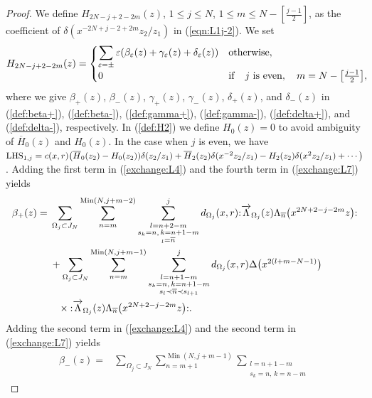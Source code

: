 \documentclass[pdftex]{sigma}
\numberwithin{equation}{section}
\begin{document}
\begin{proof}
{\sloppy We define ${H}_{2N-j+2-2m}(z)$, $1\leq j \leq N$, $1\leq m \leq N-[\frac{j-1}{2}]$,
as the coefficient of $\delta(x^{-2N+j-2+2m}z_2/z_1)$ in (\ref{eqn:L1j-2}). We set
\begin{gather}
{H}_{2N-j+2-2m}(z)=\begin{cases}
\displaystyle \sum_{\varepsilon=\pm}
\varepsilon ({\beta}_\varepsilon(z)+{\gamma}_\varepsilon(z)+{\delta}_\varepsilon(z))
& {\rm otherwise},
\\
0&{\rm {if}}\quad j~{\rm {is}~even},\quad m=N-\big[\frac{j-1}{2}\big],
\end{cases}\!\!\!\label{def:H2}
\end{gather}}%
where we give
${\beta}_+(z)$, ${\beta}_-(z)$, ${\gamma}_+(z)$,
${\gamma}_-(z)$, ${\delta}_+(z)$, and ${\delta}_-(z)$
in (\ref{def:beta+}), (\ref{def:beta-}), (\ref{def:gamma+}), (\ref{def:gamma-}),
(\ref{def:delta+}), and (\ref{def:delta-}), respectively.
In (\ref{def:H2}) we define $H_0(z)=0$ to avoid ambiguity of
$\overline{H}_0(z)$ and $H_0(z)$. In the case when $j$ is even, we have
${\rm LHS}_{1,j}=c(x,r)\big(\overline{H}_0(z_2)-H_0(z_2))\delta(z_2/z_1)
+\overline{H}_2(z_2)\delta(x^{-2}z_2/z_1)-H_2(z_2)\delta(x^2z_2/z_1)+\cdots\big)$.
Adding the first term in (\ref{exchange:L4}) and the fourth term
in (\ref{exchange:L7}) yields
\begin{align}
\beta_+(z)={}&\sum_{\Omega_j \subset J_N}
\sum_{n=m}^{\operatorname{Min}(N, j+m-2)}
\sum\limits_{\substack{l=n+2-m\\s_k=n,\, k=n+1-m
\\{_l=\overline{n}}}}^{j}d_{\Omega_j}(x,r)
{:}\overrightarrow{\Lambda}_{\Omega_j}(z)
\Lambda_{\overline{n}}\big(x^{2N+2-j-2m}z\big){:}\notag
\\
&+\sum_{\Omega_j \subset J_N}\sum_{n=m}^{\operatorname{Min}(N, j+m-1)}
\sum\limits_{\substack{l=n+1-m\\s_k=n, \, k=n+1-m\\
s_l \prec \overline{n} \prec s_{l+1}}}^{j}d_{\Omega_j}(x,r)
\Delta\big(x^{2(l+m-N-1)}\big)\notag
\\
&\phantom{+}\times{:}\overrightarrow{\Lambda}_{\Omega_j}(z)
\Lambda_{\overline{n}}\big(x^{2N+2-j-2m}z\big){:}.
\label{def:beta+}
\end{align}
Adding the second term in (\ref{exchange:L4}) and the second term in
(\ref{exchange:L7}) yields
\begin{align}
{\beta}_-(z)={}&\sum_{\Omega_j \subset J_N}\sum_{n=m+1}^{\operatorname{Min}(N, j+m-1)}
\sum\limits_{\substack{l=n+1-m\\s_k=n,\, k=n-m
}}
\end{align}
\end{proof}
\end{document}
